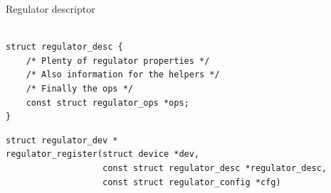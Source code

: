 \documentclass[aspectratio=169]{beamer}
\begin{document}
\begin{frame}[fragile, t]{Regulator descriptor}\vspace{4pt}



\lstset{language=C}
\scriptsize
\begin{lstlisting}

struct regulator_desc {
	/* Plenty of regulator properties */
	/* Also information for the helpers */
	/* Finally the ops */
	const struct regulator_ops *ops;
}
\end{lstlisting}

\pause
\begin{lstlisting}
struct regulator_dev *
regulator_register(struct device *dev,
                   const struct regulator_desc *regulator_desc,
                   const struct regulator_config *cfg)
\end{lstlisting}

\end{frame}

\end{document}
